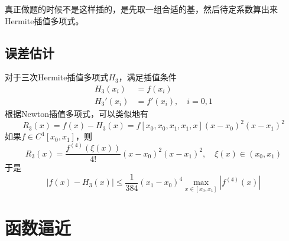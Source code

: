 \begin{kaobox}
    真正做题的时候不是这样插的，是先取一组合适的基，然后待定系数算出来Hermite插值多项式。
\end{kaobox}

\subsection{误差估计}
对于三次Hermite插值多项式$H_3$，满足插值条件
\begin{align*}
    H_3(x_i)  & =f(x_i)              \\
    H_3'(x_i) & =f'(x_i),\quad i=0,1
\end{align*}
根据Newton插值多项式，可以类似地有
\[
    R_3(x)=f(x)-H_3(x)=f[x_0,x_0,x_1,x_1,x](x-x_0)^2(x-x_1)^2
\]
如果$f\in C^4[x_0,x_1]$，则
\[
    R_3(x)=\frac{f^{(4)}(\xi(x))}{4!}(x-x_0)^2(x-x_1)^2,\quad \xi(x)\in(x_0,x_1)
\]
于是
\[
    |f(x)-H_3(x)|\le \frac{1}{384}(x_1-x_0)^4\max_{x\in[x_0,x_1]}|f^{(4)}(x)|
\]



\section{函数逼近}

